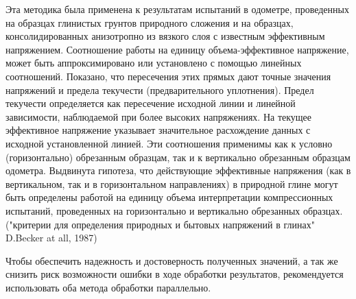    Эта методика была применена к результатам испытаний в одометре, проведенных на образцах глинистых грунтов природного сложения и на образцах, консолидированных анизотропно из вязкого слоя с известным эффективным напряжением. Соотношение работы на единицу объема-эффективное напряжение, может быть аппроксимировано или установлено с помощью линейных соотношений. Показано, что пересечения этих прямых дают точные значения напряжений и предела текучести (предварительного уплотнения). Предел текучести определяется как пересечение исходной линии и линейной зависимости, наблюдаемой при более высоких напряжениях. На текущее эффективное напряжение указывает значительное расхождение данных с исходной установленной линией. Эти соотношения применимы как к условно (горизонтально) обрезанным образцам, так и к вертикально обрезанным образцам одометра. Выдвинута гипотеза, что действующие эффективные напряжения (как в вертикальном, так и в горизонтальном направлениях) в природной глине могут быть определены работой на единицу объема интерпретации компрессионных испытаний, проведенных на горизонтально и вертикально обрезанных образцах. ("критерии для определения природных и бытовых напряжений в глинах" D.Becker at all, 1987)
  
  Чтобы обеспечить надежность и достоверность полученных значений, а так же снизить риск возможности ошибки в ходе обработки результатов, рекомендуется использовать оба метода обработки параллельно.
  